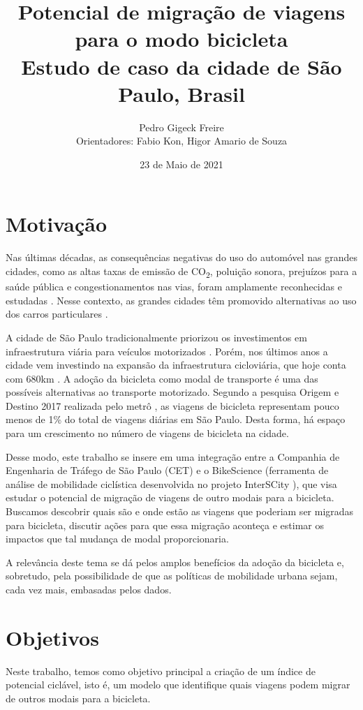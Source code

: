\documentclass[a4paper]{article}
\title{Potencial de migração de viagens para o modo bicicleta
\\ \large Estudo de caso da cidade de São Paulo, Brasil}
\author{Pedro Gigeck Freire \\
Orientadores: Fabio Kon, Higor Amario de Souza}
\date{23 de Maio de 2021}
\begin{document}
\maketitle

\section*{Motivação}

Nas últimas décadas, as consequências negativas do uso do automóvel nas grandes cidades, como as altas taxas de emissão de CO\textsubscript{2}, poluição sonora, prejuízos para a saúde pública e congestionamentos nas vias, foram amplamente reconhecidas e estudadas \cite{bikeconsequences}. Nesse contexto, as grandes cidades têm promovido alternativas ao uso dos carros particulares \cite{worldbank} \cite{mayors}.

A cidade de São Paulo tradicionalmente priorizou os investimentos em infraestrutura viária para veículos motorizados  \cite{malatesta}. Porém, nos últimos anos a cidade vem investindo na expansão da infraestrutura cicloviária, que hoje conta com 680km \cite{cet}. A adoção da bicicleta como modal de transporte é uma das possíveis alternativas ao transporte motorizado. Segundo a pesquisa Origem e Destino 2017 realizada pelo metrô \cite{OD}, as viagens de bicicleta representam pouco menos de 1\% do total de viagens diárias em São Paulo. Desta forma, há espaço para um crescimento no número de viagens de bicicleta na cidade.

Desse modo, este trabalho se insere em uma integração entre a Companhia de Engenharia de Tráfego de São Paulo (CET) e o BikeScience (ferramenta de análise de mobilidade ciclística desenvolvida no projeto InterSCity \cite{BikeScience}), que visa estudar o potencial de migração de viagens de outro modais para a bicicleta.
Buscamos descobrir quais são e onde estão as viagens que poderiam ser migradas para bicicleta, discutir ações para que essa migração aconteça e estimar os impactos que tal mudança de modal proporcionaria. 

A relevância deste tema se dá pelos amplos benefícios da adoção da bicicleta e, sobretudo, pela possibilidade de que as políticas de mobilidade urbana sejam, cada vez mais, embasadas pelos dados.

\section*{Objetivos}

Neste trabalho, temos como objetivo principal a criação de um índice de potencial ciclável, isto é, um modelo que identifique quais viagens podem migrar de outros modais para a bicicleta. 
\end{document}
